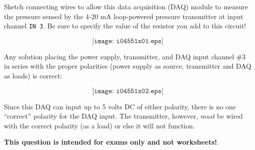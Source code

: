 

Sketch connecting wires to allow this data acquisition (DAQ) module to measure the pressure sensed by the 4-20 mA loop-powered pressure transmitter at input channel {\tt IN 3}.  Be sure to specify the value of the resistor you add to this circuit!

\vskip 50pt

$$\texttt{[image: i04551x01.eps]}$$







Any solution placing the power supply, transmitter, and DAQ input channel \#3 in series with the proper polarities (power supply as source, transmitter and DAQ as loads) is correct:

$$\texttt{[image: i04551x02.eps]}$$

Since this DAQ can input up to 5 volts DC of either polarity, there is no one ``correct'' polarity for the DAQ input.  The transmitter, however, {\it must} be wired with the correct polarity (as a load) or else it will not function.







{\bf This question is intended for exams only and not worksheets!}.


